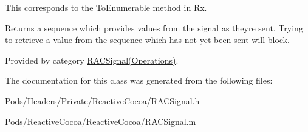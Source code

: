 This corresponds to the {\ttfamily To\+Enumerable} method in Rx.

Returns a sequence which provides values from the signal as they\textquotesingle{}re sent. Trying to retrieve a value from the sequence which has not yet been sent will block. 

Provided by category \mbox{\hyperlink{category_r_a_c_signal_07_operations_08_ae580a10328d7f204c456068a2bfb5e1b}{R\+A\+C\+Signal(\+Operations)}}.



The documentation for this class was generated from the following files\+:\begin{DoxyCompactItemize}
\item 
Pods/\+Headers/\+Private/\+Reactive\+Cocoa/R\+A\+C\+Signal.\+h\item 
Pods/\+Reactive\+Cocoa/\+Reactive\+Cocoa/R\+A\+C\+Signal.\+m\end{DoxyCompactItemize}
